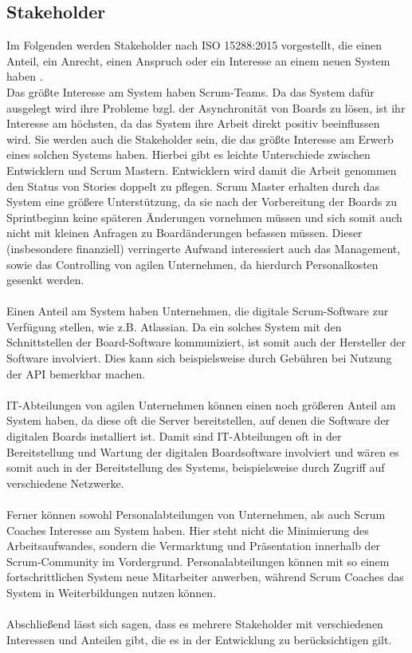 \documentclass[12pt,titlepage]{scrartcl}
\begin{document}
		\subsection{Stakeholder}
		Im Folgenden werden Stakeholder nach ISO 15288:2015 vorgestellt, die einen Anteil, ein Anrecht, einen Anspruch oder ein Interesse an einem neuen System haben \cite{ISO15288}.  \\
		Das größte Interesse am System haben Scrum-Teams. Da das System dafür ausgelegt wird ihre Probleme bzgl. der Asynchronität von Boards zu lösen, ist ihr Interesse am höchsten, da das System ihre Arbeit direkt positiv beeinflussen wird. Sie werden auch die Stakeholder sein, die das größte Interesse am Erwerb eines solchen Systems haben. Hierbei gibt es leichte Unterschiede zwischen Entwicklern und Scrum Mastern. Entwicklern wird damit die Arbeit genommen den Status von Stories doppelt zu pflegen. Scrum Master erhalten durch das System eine größere Unterstützung, da sie nach der Vorbereitung der Boards zu Sprintbeginn keine späteren Änderungen vornehmen müssen und sich somit auch nicht mit kleinen Anfragen zu Boardänderungen befassen müssen. Dieser (insbesondere finanziell) verringerte Aufwand interessiert auch das Management, sowie das Controlling von agilen Unternehmen, da hierdurch Personalkosten gesenkt werden. \\ \\
		Einen Anteil am System haben Unternehmen, die digitale Scrum-Software zur Verfügung stellen, wie z.B. Atlassian. Da ein solches System mit den Schnittstellen der Board-Software kommuniziert, ist somit auch der Hersteller der Software involviert. Dies kann sich beispielsweise durch Gebühren bei Nutzung der API bemerkbar machen. \\ \\
		IT-Abteilungen von agilen Unternehmen können einen noch größeren Anteil am System haben, da diese oft die Server bereitstellen, auf denen die Software der digitalen Boards installiert ist. Damit sind IT-Abteilungen oft in der Bereitstellung und Wartung der digitalen Boardsoftware involviert und wären es somit auch in der Bereitstellung des Systems, beispielsweise durch Zugriff auf verschiedene Netzwerke. \\ \\
		Ferner können sowohl Personalabteilungen von Unternehmen, als auch Scrum Coaches Interesse am System haben. Hier steht nicht die Minimierung des Arbeitsaufwandes, sondern die Vermarktung und Präsentation innerhalb der Scrum-Community im Vordergrund. Personalabteilungen können mit so einem fortschrittlichen System neue Mitarbeiter anwerben, während Scrum Coaches das System in Weiterbildungen nutzen können. \\ \\
		Abschließend lässt sich sagen, dass es mehrere Stakeholder mit verschiedenen Interessen und Anteilen gibt, die es in der Entwicklung zu berücksichtigen gilt.
\end{document}

